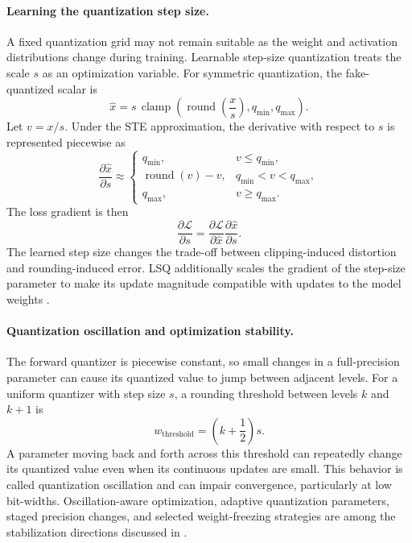 \paragraph{Learning the quantization step size.}
A fixed quantization grid may not remain suitable as the weight and
activation distributions change during training. Learnable step-size
quantization treats the scale \(s\) as an optimization variable. For
symmetric quantization, the fake-quantized scalar is
\begin{equation}
    \widehat{x}
    =
    s\,
    \operatorname{clamp}
    \left(
        \operatorname{round}\left(\frac{x}{s}\right),
        q_{\min},q_{\max}
    \right).
    \label{eq:quant-learnable-step-output}
\end{equation}
Let \(v=x/s\). Under the STE approximation, the derivative with respect
to \(s\) is represented piecewise as
\begin{equation}
    \frac{\partial\widehat{x}}{\partial s}
    \approx
    \begin{cases}
        q_{\min}, & v\leq q_{\min},\\
        \operatorname{round}(v)-v,
            & q_{\min}<v<q_{\max},\\
        q_{\max}, & v\geq q_{\max}.
    \end{cases}
    \label{eq:quant-lsq-step-gradient}
\end{equation}
The loss gradient is then
\begin{equation}
    \frac{\partial\mathcal{L}}{\partial s}
    =
    \frac{\partial\mathcal{L}}{\partial\widehat{x}}
    \frac{\partial\widehat{x}}{\partial s}.
    \label{eq:quant-lsq-chain-rule}
\end{equation}
The learned step size changes the trade-off between clipping-induced
distortion and rounding-induced error. LSQ additionally scales the
gradient of the step-size parameter to make its update magnitude
compatible with updates to the model weights
\parencite{song2026targetcentricqat}.

\paragraph{Quantization oscillation and optimization stability.}
The forward quantizer is piecewise constant, so small changes in a
full-precision parameter can cause its quantized value to jump between
adjacent levels. For a uniform quantizer with step size \(s\), a
rounding threshold between levels \(k\) and \(k+1\) is
\begin{equation}
    w_{\mathrm{threshold}}
    =
    \left(k+\frac{1}{2}\right)s.
    \label{eq:quant-threshold}
\end{equation}
A parameter moving back and forth across this threshold can repeatedly
change its quantized value even when its continuous updates are small.
This behavior is called quantization oscillation and can impair
convergence, particularly at low bit-widths. Oscillation-aware
optimization, adaptive quantization parameters, staged precision
changes, and selected weight-freezing strategies are among the
stabilization directions discussed in
\textcite{song2026targetcentricqat}.

